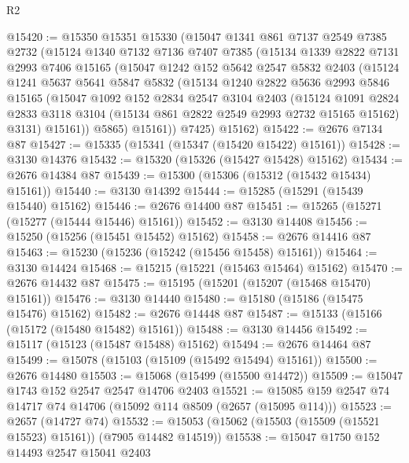 \begin{lexlean}{R2}
\begin{coremodule}
@15420 := @15350
    @15351
    @15330
    (@15047
      @1341
      @861
      @7137
      @2549
      @7385
      @2732
      (@15124
        @1340
        @7132
        @7136
        @7407
        @7385
        (@15134
          @1339
          @2822
          @7131
          @2993
          @7406
          @15165
          (@15047
            @1242
            @152
            @5642
            @2547
            @5832
            @2403
            (@15124
              @1241
              @5637
              @5641
              @5847
              @5832
              (@15134
                @1240
                @2822
                @5636
                @2993
                @5846
                @15165
                (@15047
                  @1092
                  @152
                  @2834
                  @2547
                  @3104
                  @2403
                  (@15124
                    @1091
                    @2824
                    @2833
                    @3118
                    @3104
                    (@15134 @861 @2822 @2549 @2993 @2732 @15165 @15162)
                    @3131)
                  @15161))
              @5865)
            @15161))
        @7425)
      @15162)
@15422 := @2676 @7134 @87
@15427 := @15335 (@15341 (@15347 (@15420 @15422) @15161))
@15428 := @3130 @14376
@15432 := @15320 (@15326 (@15427 @15428) @15162)
@15434 := @2676 @14384 @87
@15439 := @15300 (@15306 (@15312 (@15432 @15434) @15161))
@15440 := @3130 @14392
@15444 := @15285 (@15291 (@15439 @15440) @15162)
@15446 := @2676 @14400 @87
@15451 := @15265 (@15271 (@15277 (@15444 @15446) @15161))
@15452 := @3130 @14408
@15456 := @15250 (@15256 (@15451 @15452) @15162)
@15458 := @2676 @14416 @87
@15463 := @15230 (@15236 (@15242 (@15456 @15458) @15161))
@15464 := @3130 @14424
@15468 := @15215 (@15221 (@15463 @15464) @15162)
@15470 := @2676 @14432 @87
@15475 := @15195 (@15201 (@15207 (@15468 @15470) @15161))
@15476 := @3130 @14440
@15480 := @15180 (@15186 (@15475 @15476) @15162)
@15482 := @2676 @14448 @87
@15487 := @15133 (@15166 (@15172 (@15480 @15482) @15161))
@15488 := @3130 @14456
@15492 := @15117 (@15123 (@15487 @15488) @15162)
@15494 := @2676 @14464 @87
@15499 := @15078 (@15103 (@15109 (@15492 @15494) @15161))
@15500 := @2676 @14480
@15503 := @15068 (@15499 (@15500 @14472))
@15509 := @15047 @1743 @152 @2547 @2547 @14706 @2403
@15521 := @15085 @159 @2547 @74 @14717 @74 @14706 (@15092 @114 @8509 (@2657 (@15095 @114)))
@15523 := @2657 (@14727 @74)
@15532 := @15053 (@15062 (@15503 (@15509 (@15521 @15523) @15161)) (@7905 @14482 @14519))
@15538 := @15047 @1750 @152 @14493 @2547 @15041 @2403

\end{coremodule}
\end{lexlean}
